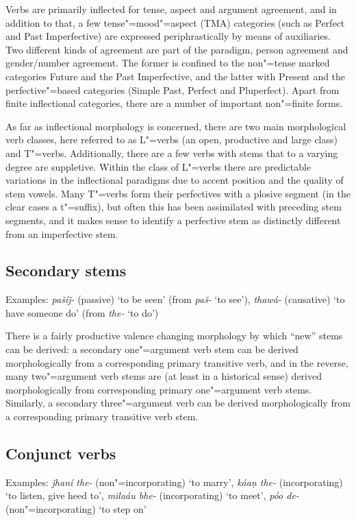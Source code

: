 Verbs are primarily inflected for tense, aspect and argument agreement, and in addition to that, a few tense"=mood"=aspect (TMA) categories (such as Perfect and Past Imperfective) are expressed periphrastically by means of auxiliaries. Two different kinds of agreement are part of the paradigm, person agreement and gender/number agreement. The former is confined to the non"=tense marked categories Future and the Past Imperfective, and the latter with Present and the perfective"=based categories (Simple Past, Perfect and Pluperfect). Apart from finite inflectional categories, there are a number of important non"=finite forms.


As far as inflectional morphology is concerned, there are two main morphological verb classes, here referred to as L"=verbs (an open, productive and large class) and T"=verbs. Additionally, there are a few verbs with stems that to a varying degree are suppletive. Within the class of L"=verbs there are predictable variations in the inflectional paradigms due to accent position and the quality of stem vowels. Many T"=verbs form their perfectives with a plosive segment (in the clear cases a t"=suffix), but often this has been assimilated with preceding stem segments, and it makes sense to identify a perfective stem as distinctly different from an imperfective stem.


\subsection{Secondary stems}
\label{subsec:3b-3-1}
Examples: \textit{pašíǰ-} (passive) `to be seen' (from \textit{paš-} `to see'), \textit{thawá-} (causative) `to have someone do' (from \textit{the-} `to do')


There is a fairly productive valence changing morphology by which “new” stems can be derived: a secondary one"=argument verb stem can be derived morphologically from a corresponding primary transitive verb, and in the reverse, many two"=argument verb stems are (at least in a historical sense) derived morphologically from corresponding primary one"=argument verb stems. Similarly, a secondary three"=argument verb can be derived morphologically from a corresponding primary transitive verb stem. 


\subsection{Conjunct verbs}
\label{subsec:3b-3-2}
Examples: \textit{ǰhaní the-} (non"=incorporating) `to marry', \textit{káaṇ the-} (incorporating) `to listen, give heed to', \textit{milaáu bhe-} (incorporating) `to meet', \textit{póo de-} (non"=incorporating) `to step on'


